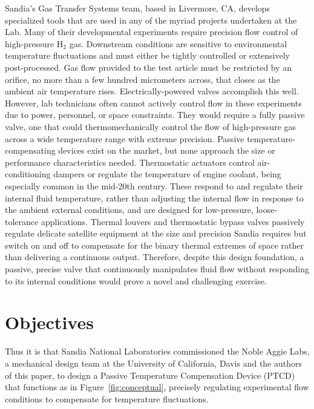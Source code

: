 \documentclass[12pt, letterpaper]{report}%
\newcommand{\device}{PTCD}
\begin{document}
		Sandia's Gas Transfer Systems team, based in Livermore, CA, develops specialized tools that are used in any of the myriad projects undertaken at the Lab.
		Many of their developmental experiments require precision flow control of high-pressure $\text{H}_{\text{2}}$ gas.
		Downstream conditions are sensitive to environmental temperature fluctuations and must either be tightly controlled or extensively post-processed.
		Gas flow provided to the test article must be restricted by an orifice, no more than a few hundred micrometers across, that closes as the ambient air temperature rises.
		Electrically-powered valves accomplish this well.
		However, lab technicians often cannot actively control flow in these experiments due to power, personnel, or space constraints.
		They would require a fully passive valve, one that could thermomechanically control the flow of high-pressure gas across a wide temperature range with extreme precision.
		Passive temperature-compensating devices exist on the market, but none approach the size or performance characteristics needed.
		Thermostatic actuators\cite{ref_ASHRAE_thermostatic, ref_Vernet_1938} control air-conditioning dampers or regulate the temperature of engine coolant, being especially common in the mid-20th century.
		These respond to and regulate their internal fluid temperature, rather than adjusting the internal flow in response to the ambient external conditions,
		and are designed for low-pressure, loose-tolerance applications.
		Thermal louvers and thermostatic bypass valves\cite{ref_Bugby_2021, ref_Ralphs_2024, ref_Ralphs_2026} passively regulate delicate satellite equipment at the size and precision Sandia requires
		but switch on and off to compensate for the binary thermal extremes of space rather than delivering a continuous output.
		Therefore, despite this design foundation, a passive, precise valve that continuously manipulates fluid flow without responding to its internal conditions would prove a novel and challenging exercise.

	\section{Objectives}
	\label{sec:intro:objectives}

		Thus it is that Sandia National Laboratories commissioned the Noble Aggie Labs, a mechanical design team at the University of California, Davis and the authors of this paper,
		to design a Passive Temperature Compensation Device (\device)\cite{ref_sandiaprompt} that functions as in Figure~\ref{fig:conceptual}, precisely regulating experimental flow conditions
		to compensate for temperature fluctuations.
\end{document}
